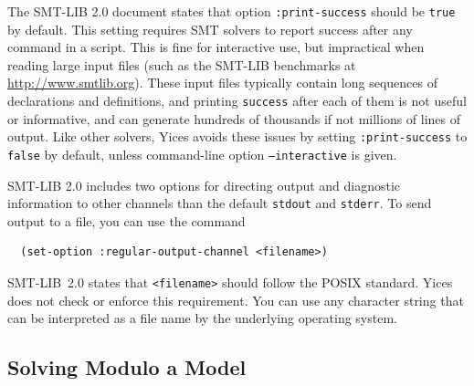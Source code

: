 \documentclass[11pt,twoside,fleqn,openright,titlepage]{cslreport}
\begin{document}
The SMT-LIB 2.0 document states that option \texttt{:print-success}
should be \texttt{true} by default. This setting requires SMT solvers
to report success after any command in a script. This is fine for
interactive use, but impractical when reading large input files (such
as the SMT-LIB benchmarks at \url{http://www.smtlib.org}). These
input files typically contain long sequences of declarations and
definitions, and printing \texttt{success} after each of them is not
useful or informative, and can generate hundreds of thousands if not
millions of lines of output.  Like other solvers, Yices avoids these
issues by setting \texttt{:print-success} to \texttt{false} by default,
unless command-line option \texttt{--interactive} is given.


\medskip\noindent SMT-LIB 2.0 includes two options for directing
output and diagnostic information to other channels than the default
\texttt{stdout} and \texttt{stderr}. To send output to a file, you can
use the command
\begin{small}
\begin{verbatim}
  (set-option :regular-output-channel <filename>)
\end{verbatim}
\end{small}
SMT-LIB~2.0 states that \texttt{<filename>} should follow the POSIX
standard. Yices does not check or enforce this requirement. You can
use any character string that can be interpreted as a file name by the
underlying operating system.


\subsection{Solving Modulo a Model}
\end{document}
